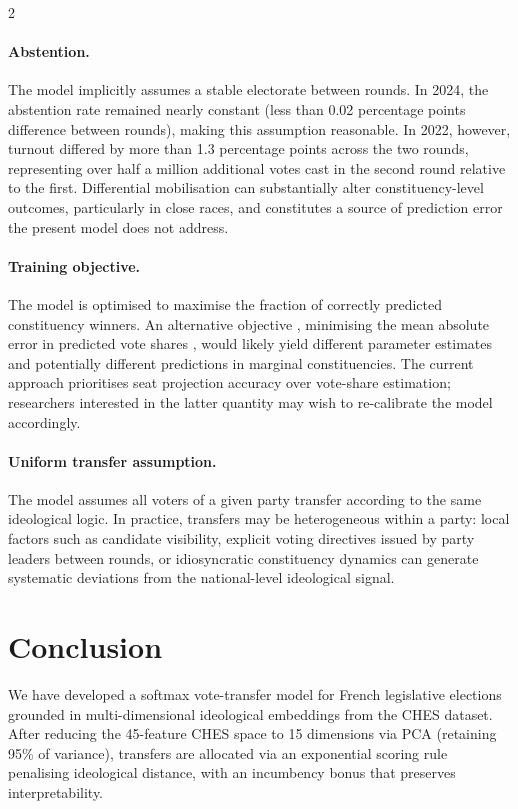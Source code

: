 \documentclass[10pt, a4paper]{article}
\begin{document}
\begin{multicols}{2}
\paragraph{Abstention.}
The model implicitly assumes a stable electorate between rounds. In 2024, the
abstention rate remained nearly constant (less than 0.02 percentage points
difference between rounds), making this assumption reasonable. In 2022,
however, turnout differed by more than 1.3 percentage points across the two
rounds, representing over half a million additional votes cast in the second
round relative to the first. Differential mobilisation can substantially alter
constituency-level outcomes, particularly in close races, and constitutes a
source of prediction error the present model does not address.

\paragraph{Training objective.}
The model is optimised to maximise the fraction of correctly predicted
constituency winners. An alternative objective , minimising the mean
absolute error in predicted vote shares , would likely yield different
parameter estimates and potentially different predictions in marginal
constituencies. The current approach prioritises seat projection accuracy over
vote-share estimation; researchers interested in the latter quantity may wish
to re-calibrate the model accordingly.

\paragraph{Uniform transfer assumption.}
The model assumes all voters of a given party transfer according to the same
ideological logic. In practice, transfers may be heterogeneous within a party:
local factors such as candidate visibility, explicit voting directives issued
by party leaders between rounds, or idiosyncratic constituency dynamics can
generate systematic deviations from the national-level ideological signal.

\section{Conclusion}
\label{sec:conclusion}

We have developed a softmax vote-transfer model for French legislative
elections grounded in multi-dimensional ideological embeddings from the CHES
dataset.
After reducing the 45-feature CHES space to 15 dimensions via PCA (retaining
95\% of variance), transfers are allocated via an exponential scoring rule
penalising ideological distance, with an incumbency bonus that preserves
interpretability.


\end{multicols}
\end{document}
